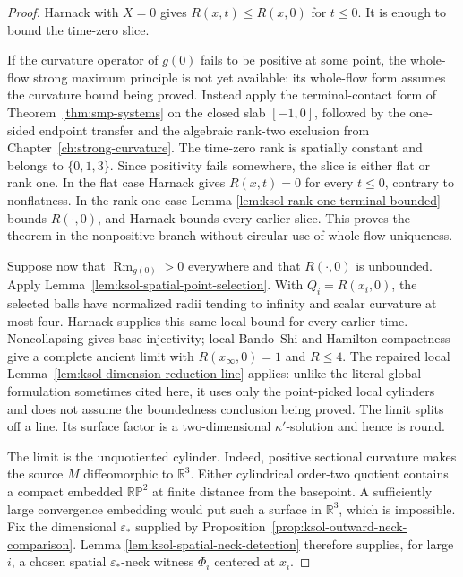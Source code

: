 \documentclass[10pt]{coll-l}
\newcommand{\R}{\mathbb{R}}
\theoremstyle{definition}
\theoremstyle{remark}
\numberwithin{section}{chapter}
\numberwithin{equation}{chapter}
\newcommand{\Rm}{\operatorname{Rm}}
\begin{document}
\begin{proof}
Harnack with $X=0$ gives $R(x,t)\leq R(x,0)$ for $t\leq0$.  It is enough to
bound the time-zero slice.

If the curvature operator of $g(0)$ fails to be positive at some point,
the whole-flow strong maximum principle is not yet available: its
whole-flow form assumes the curvature bound being proved.  Instead apply
the terminal-contact form of
Theorem~\ref{thm:smp-systems} on the closed slab $[-1,0]$, followed by the
one-sided endpoint transfer and the algebraic rank-two exclusion from
Chapter~\ref{ch:strong-curvature}.  The time-zero rank is spatially
constant and belongs to $\{0,1,3\}$.  Since positivity fails somewhere,
the slice is either flat or rank one.  In the flat case Harnack gives
$R(x,t)=0$ for every $t\leq0$,
contrary to nonflatness.  In the rank-one case Lemma
\ref{lem:ksol-rank-one-terminal-bounded} bounds $R(\cdot,0)$, and Harnack
bounds every earlier slice.  This proves the theorem in the nonpositive
branch without circular use of whole-flow uniqueness.

Suppose now that $\Rm_{g(0)}>0$ everywhere and that $R(\cdot,0)$ is
unbounded.  Apply
Lemma~\ref{lem:ksol-spatial-point-selection}.  With
$Q_i=R(x_i,0)$, the selected balls have normalized radii tending to infinity
and scalar curvature at most four.  Harnack supplies this same local bound
for every earlier time.  Noncollapsing gives base injectivity; local
Bando--Shi and Hamilton compactness give a complete ancient limit with
$R(x_\infty,0)=1$ and $R\leq4$.  The repaired local
Lemma~\ref{lem:ksol-dimension-reduction-line} applies: unlike the literal
global formulation sometimes cited here, it uses only the point-picked
local cylinders and does not assume the boundedness conclusion being
proved.  The limit splits off a line.  Its surface factor is a
two-dimensional $\kappa'$-solution and hence is round.

The limit is the unquotiented cylinder.  Indeed, positive sectional
curvature makes the source $M$ diffeomorphic to $\R^3$.  Either cylindrical
order-two quotient contains a compact embedded $\mathbb{RP}^2$ at finite
distance from the basepoint.  A sufficiently large convergence embedding
would put such a surface in $\R^3$, which is impossible.  Fix the
dimensional $\varepsilon_*$ supplied by
Proposition~\ref{prop:ksol-outward-neck-comparison}.  Lemma
\ref{lem:ksol-spatial-neck-detection} therefore supplies, for large $i$, a
chosen spatial $\varepsilon_*$-neck witness $\Phi_i$ centered at $x_i$.


\end{proof}
\end{document}
